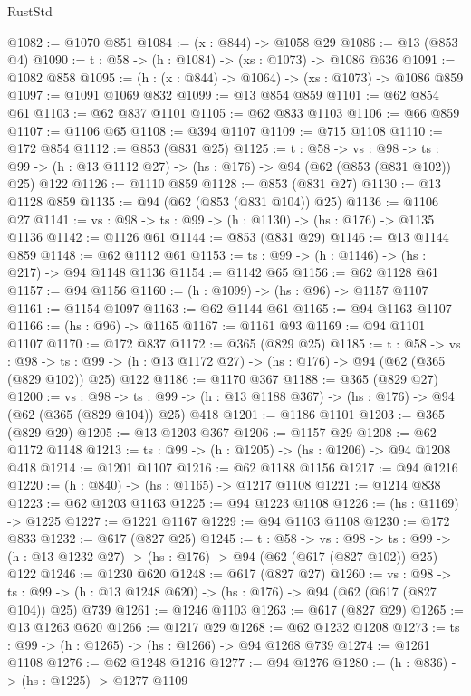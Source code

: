 \begin{lexlean}{RustStd}
\begin{coremodule}
@1082 := @1070 @851
@1084 := (x : @844) -> @1058 @29
@1086 := @13 (@853 @4)
@1090 := {t : @58} -> (h : @1084) -> (xs : @1073) -> @1086 @636
@1091 := @1082 @858
@1095 := (h : (x : @844) -> @1064) -> (xs : @1073) -> @1086 @859
@1097 := @1091 @1069 @832
@1099 := @13 @854 @859
@1101 := @62 @854 @61
@1103 := @62 @837 @1101
@1105 := @62 @833 @1103
@1106 := @66 @859
@1107 := @1106 @65
@1108 := @394 @1107
@1109 := @715 @1108
@1110 := @172 @854
@1112 := @853 (@831 @25)
@1125 := {t : @58} ->
  {vs : @98} ->
  {ts : @99} -> (h : @13 @1112 @27) -> (hs : @176) -> @94 (@62 (@853 (@831 @102)) @25) @122
@1126 := @1110 @859
@1128 := @853 (@831 @27)
@1130 := @13 @1128 @859
@1135 := @94 (@62 (@853 (@831 @104)) @25)
@1136 := @1106 @27
@1141 := {vs : @98} -> {ts : @99} -> (h : @1130) -> (hs : @176) -> @1135 @1136
@1142 := @1126 @61
@1144 := @853 (@831 @29)
@1146 := @13 @1144 @859
@1148 := @62 @1112 @61
@1153 := {ts : @99} -> (h : @1146) -> (hs : @217) -> @94 @1148 @1136
@1154 := @1142 @65
@1156 := @62 @1128 @61
@1157 := @94 @1156
@1160 := (h : @1099) -> (hs : @96) -> @1157 @1107
@1161 := @1154 @1097
@1163 := @62 @1144 @61
@1165 := @94 @1163 @1107
@1166 := (hs : @96) -> @1165
@1167 := @1161 @93
@1169 := @94 @1101 @1107
@1170 := @172 @837
@1172 := @365 (@829 @25)
@1185 := {t : @58} ->
  {vs : @98} ->
  {ts : @99} -> (h : @13 @1172 @27) -> (hs : @176) -> @94 (@62 (@365 (@829 @102)) @25) @122
@1186 := @1170 @367
@1188 := @365 (@829 @27)
@1200 := {vs : @98} ->
  {ts : @99} -> (h : @13 @1188 @367) -> (hs : @176) -> @94 (@62 (@365 (@829 @104)) @25) @418
@1201 := @1186 @1101
@1203 := @365 (@829 @29)
@1205 := @13 @1203 @367
@1206 := @1157 @29
@1208 := @62 @1172 @1148
@1213 := {ts : @99} -> (h : @1205) -> (hs : @1206) -> @94 @1208 @418
@1214 := @1201 @1107
@1216 := @62 @1188 @1156
@1217 := @94 @1216
@1220 := (h : @840) -> (hs : @1165) -> @1217 @1108
@1221 := @1214 @838
@1223 := @62 @1203 @1163
@1225 := @94 @1223 @1108
@1226 := (hs : @1169) -> @1225
@1227 := @1221 @1167
@1229 := @94 @1103 @1108
@1230 := @172 @833
@1232 := @617 (@827 @25)
@1245 := {t : @58} ->
  {vs : @98} ->
  {ts : @99} -> (h : @13 @1232 @27) -> (hs : @176) -> @94 (@62 (@617 (@827 @102)) @25) @122
@1246 := @1230 @620
@1248 := @617 (@827 @27)
@1260 := {vs : @98} ->
  {ts : @99} -> (h : @13 @1248 @620) -> (hs : @176) -> @94 (@62 (@617 (@827 @104)) @25) @739
@1261 := @1246 @1103
@1263 := @617 (@827 @29)
@1265 := @13 @1263 @620
@1266 := @1217 @29
@1268 := @62 @1232 @1208
@1273 := {ts : @99} -> (h : @1265) -> (hs : @1266) -> @94 @1268 @739
@1274 := @1261 @1108
@1276 := @62 @1248 @1216
@1277 := @94 @1276
@1280 := (h : @836) -> (hs : @1225) -> @1277 @1109

\end{coremodule}
\end{lexlean}
